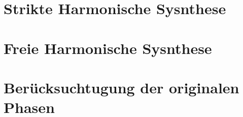 \section{Strikte Harmonische Sysnthese}
\label{sec:2}

\subsection{}


\subsection{}


\section{Freie Harmonische Sysnthese}
\label{sec:3}

\subsection{}

\subsection{}


\section{Berücksuchtugung der originalen Phasen}
\label{sec:4}